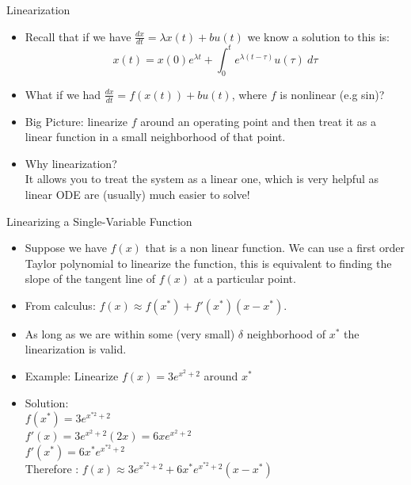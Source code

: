 \documentclass{beamer}
\begin{document}
	\begin{frame}{Linearization}
	\begin{itemize}


	    \item Recall that if we have $\frac{dx}{dt} = \lambda x(t) + bu(t)$ we know a solution to this is: $$x(t) = x(0)e^{\lambda t} + \int_0^t \! e^{\lambda(t - \tau)}u(\tau)\ d\tau$$
	    \item What if we had $\frac{dx}{dt} = f(x(t)) + bu(t)$, where $f$ is nonlinear (e.g sin)? \pause \\
	    \item Big Picture: linearize $f$ around an operating point and then treat it as a linear function in a small neighborhood of that point.\\
	    \item Why linearization? \pause
	    \\ It allows you to treat the system as a linear one, which is very helpful as linear ODE are (usually) much easier to solve!
	\end{itemize}
	\end{frame}
	\begin{frame}{Linearizing a Single-Variable Function}
	  \begin{itemize}
	      \item Suppose we have $f(x)$ that is a non linear function. We can use a first order Taylor polynomial to linearize the function, this is equivalent to finding the slope of the tangent line of $f(x)$ at a particular point.
	      \item From calculus: $f(x) \approx f(x^*) + f'(x^*)(x - x^*)$.
	      \item As long as we are within some (very small) $\delta$ neighborhood of $x^*$ the linearization is valid.
	      \item Example: Linearize $f(x) = 3e^{x^2 + 2}$ around $x^*$ 
	      \item Solution: \\
	      $f(x^*) = 3e^{x^{*2} + 2}$\\
	      $f'(x) = 3e^{x^2+2}(2x) = 6xe^{x^2+2}$\\
	      $f'(x^*) = 6x^*e^{x^{*2}+2}$\\
	      Therefore :
	      $f(x) \approx 3e^{x^{*2} + 2} +  6x^*e^{x^{*2}+2}(x-x^*) $
	  \end{itemize}
	  
	\end{frame}
\end{document}
